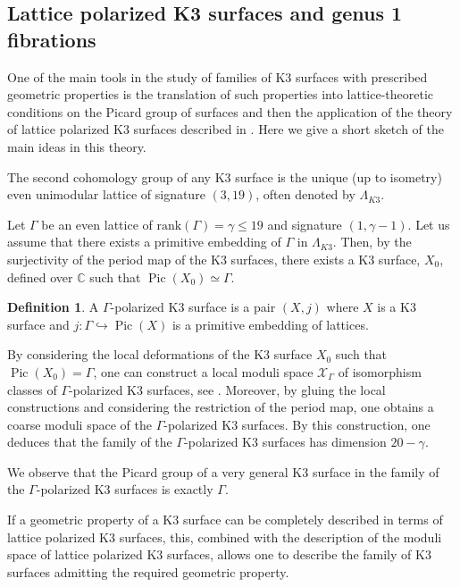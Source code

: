 \documentclass{amsart}
\theoremstyle{definition}
\newtheorem{definition}[theorem]{Definition}
\numberwithin{equation}{section}
\newcommand{\rk}{\mbox{rank}}
\DeclareMathOperator{\Pic}{Pic}
\begin{document}
\subsection{Lattice polarized K3 surfaces and genus 1 fibrations}

One of the main tools in the study of families of K3 surfaces with prescribed geometric properties is the translation of such properties into lattice-theoretic conditions on the Picard group of surfaces and then the application of the theory of lattice polarized K3 surfaces described in \cite{Do}. Here we give a short sketch of the main ideas in this theory.


The second cohomology group of any K3 surface is the unique (up to isometry) even unimodular lattice of signature $(3,19)$, often denoted by $\Lambda_{K3}$.

Let $\Gamma$ be an even lattice of $\rk(\Gamma)=\gamma\leq 19$ and signature $(1,\gamma-1)$. Let us assume that there exists a primitive embedding of $\Gamma$ in $\Lambda_{K3}$. Then, by the surjectivity of the period map of the K3 surfaces, there exists a K3 surface, $X_0$, defined over $\mathbb{C}$ such that $\Pic(X_0)\simeq \Gamma$.

\begin{definition}
    A $\Gamma$-polarized K3 surface is a pair $(X, j)$ where $X$ is a K3 surface and $j:\Gamma\hookrightarrow \Pic(X)$ is a primitive embedding of lattices.
\end{definition}

By considering the local deformations of the K3 surface $X_0$ such that $\Pic(X_0)=\Gamma$, one can construct a local moduli space $\mathcal{X}_\Gamma$ of isomorphism classes of $\Gamma$-polarized K3 surfaces, see \cite{Do}. Moreover, by gluing the local constructions and considering the restriction of the period map, one obtains a coarse moduli space of the $\Gamma$-polarized K3 surfaces. By this construction, one deduces that the family of the $\Gamma$-polarized K3 surfaces has dimension $20-\gamma$.

We observe that the Picard group of a very general K3 surface in the family of the $\Gamma$-polarized K3 surfaces is exactly $\Gamma$.

If a geometric property of a K3 surface can be completely described in terms of lattice polarized K3 surfaces, this, combined with the description of the moduli space of lattice polarized K3 surfaces, allows one to describe the family of K3 surfaces admitting the required geometric property.
\end{document}
